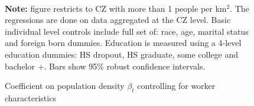 \begin{figure}[!h]
\centering
\caption{Coefficient on population density $ \beta_t $ controlling for worker characteristics}
  \\ 
\par \begin{minipage}[h]{\textwidth}{\tiny\textbf{Note:} figure restricts to CZ with more than 1 people per km$^2$. The regressions are done on data aggregated at the CZ level. Basic individual level controls include full set of: race, age, marital status and foreign born dummies. Education is measured using a 4-level education dummies: HS dropout, HS graduate, some college and bachelor +. Bars show 95\% robust confidence intervals.}\end{minipage}
\end{figure}
